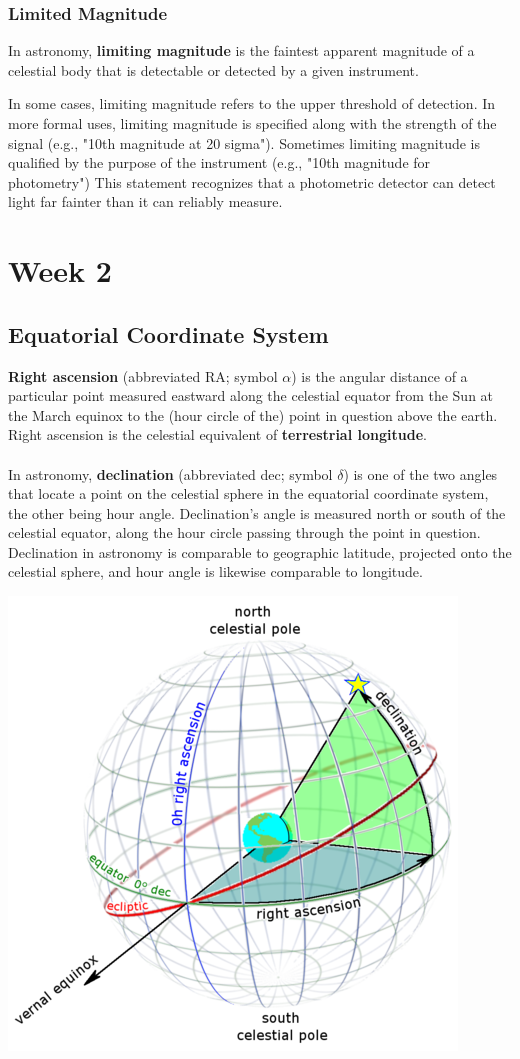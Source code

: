 \documentclass{article}
\begin{document}
\subsubsection{Limited Magnitude}
In astronomy, \textbf{limiting magnitude} is the faintest apparent magnitude of a celestial body that is detectable or detected by a given instrument.\par
In some cases, limiting magnitude refers to the upper threshold of detection. In more formal uses, limiting magnitude is specified along with the strength of the signal (e.g., "10th magnitude at 20 sigma"). Sometimes limiting magnitude is qualified by the purpose of the instrument (e.g., "10th magnitude for photometry") This statement recognizes that a photometric detector can detect light far fainter than it can reliably measure.
\section{Week 2}
\subsection{Equatorial Coordinate System}
\textbf{Right ascension} (abbreviated RA; symbol $\alpha$) is the angular distance of a particular point measured eastward along the celestial equator from the Sun at the March equinox to the (hour circle of the) point in question above the earth. Right ascension is the celestial equivalent of \textbf{terrestrial longitude}. \\
\\
In astronomy, \textbf{declination} (abbreviated dec; symbol $\delta$) is one of the two angles that locate a point on the celestial sphere in the equatorial coordinate system, the other being hour angle. Declination's angle is measured north or south of the celestial equator, along the hour circle passing through the point in question. Declination in astronomy is comparable to geographic latitude, projected onto the celestial sphere, and hour angle is likewise comparable to longitude.
\begin{center}
\includegraphics[scale = 0.35]{rc and dec.png}
\end{center}
\end{document}
